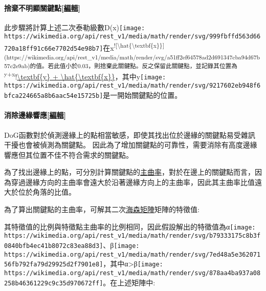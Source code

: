 \documentclass[
]{article}
\begin{document}
\hypertarget{header-n44}{%
\paragraph{\texorpdfstring{捨棄不明顯關鍵點{[}\href{https://zh.wikipedia.org/w/index.php?title=尺度不變特徵轉換\&action=edit\&section=6}{編輯}{]}}{捨棄不明顯關鍵點{[}編輯{]}}}\label{header-n44}}

此步驟將計算上述二次泰勒級數D(x)\texttt{[image: https://wikimedia.org/api/rest\_v1/media/math/render/svg/999fbffd563d66720a18ff91c66e7702d54e98b7]}在x\textsuperscript{!{[}\textbackslash hat\{\textbackslash textbf\{x\}\}{]}(https://wikimedia.org/api/rest\_v1/media/math/render/svg/a51ff2ef64578ad2d691347cba94d67b57c2e9ab)的值。若此值小於0.03，則捨棄此關鍵點。反之保留此關鍵點，並記錄其位置為y+x}!\href{https://wikimedia.org/api/rest_v1/media/math/render/svg/c8478657a4454df2961bcc2c2ae5211656be2eb0}{\textbackslash textbf\{y\}
+
\textbackslash hat\{\textbackslash textbf\{x\}\}}，其中y\texttt{[image: https://wikimedia.org/api/rest\_v1/media/math/render/svg/9217602eb948f6bfca224665a8b6aac54e15725b]}是一開始關鍵點的位置。

\hypertarget{header-n46}{%
\paragraph{\texorpdfstring{消除邊緣響應{[}\href{https://zh.wikipedia.org/w/index.php?title=尺度不變特徵轉換\&action=edit\&section=7}{編輯}{]}}{消除邊緣響應{[}編輯{]}}}\label{header-n46}}

DoG函數對於偵測邊緣上的點相當敏感，即使其找出位於邊緣的關鍵點易受雜訊干擾也會被偵測為關鍵點。
因此為了增加關鍵點的可靠性，需要消除有高度邊緣響應但其位置不佳不符合需求的關鍵點。

為了找出邊緣上的點，可分別計算關鍵點的\href{https://zh.wikipedia.org/wiki/主曲率}{主曲率}，對於在邊上的關鍵點而言，因為穿過邊緣方向的主曲率會遠大於沿著邊緣方向上的主曲率，因此其主曲率比值遠大於位於角落的比值。

為了算出關鍵點的主曲率，可解其二次\href{https://zh.wikipedia.org/wiki/海森矩阵}{海森矩陣}矩陣的特徵值:

其特徵值的比例與特徵點主曲率的比例相同，因此假設解出的特徵值為α\texttt{[image: https://wikimedia.org/api/rest\_v1/media/math/render/svg/b79333175c8b3f0840bfb4ec41b8072c83ea88d3]}、β\texttt{[image: https://wikimedia.org/api/rest\_v1/media/math/render/svg/7ed48a5e36207156fb792fa79d29925d2f7901e8]}，其中α\textgreater β\texttt{[image: https://wikimedia.org/api/rest\_v1/media/math/render/svg/878aa4ba937a08258b46361229c9c35d970672ff]}。在上述矩陣中:
\end{document}
